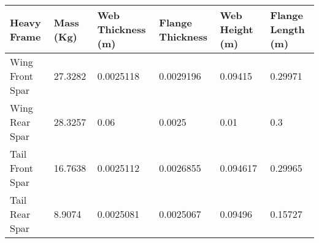 \begin{tabular}{llllll}
Heavy Frame & Mass (Kg) & Web Thickness (m) & Flange Thickness & Web Height (m) & Flange Length (m) \\ 
\hline 
Wing Front Spar & 27.3282 & 0.0025118 & 0.0029196 & 0.09415 & 0.29971 \\ 
Wing Rear Spar & 28.3257 & 0.06 & 0.0025 & 0.01 & 0.3 \\ 
Tail Front Spar & 16.7638 & 0.0025112 & 0.0026855 & 0.094617 & 0.29965 \\ 
Tail Rear Spar & 8.9074 & 0.0025081 & 0.0025067 & 0.09496 & 0.15727 \\ 
\hline 
\end{tabular}